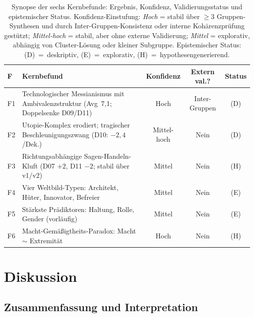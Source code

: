 \documentclass[12pt,a4paper]{article}
\begin{document}

\begin{table}[htbp]
  \centering
  \caption{Synopse der sechs Kernbefunde: Ergebnis, Konfidenz, Validierungsstatus und epistemischer Status. Konfidenz-Einstufung: \emph{Hoch} = stabil \"uber $\geq 3$ Gruppen-Synthesen und durch Inter-Gruppen-Konsistenz oder interne Koh\"arenzpr\"ufung gest\"utzt; \emph{Mittel-hoch} = stabil, aber ohne externe Validierung; \emph{Mittel} = explorativ, abh\"angig von Cluster-L\"osung oder kleiner Subgruppe. Epistemischer Status: (D)~=~deskriptiv, (E)~=~explorativ, (H)~=~hypothesengenerierend.}
  \label{tab:synopse}
  \footnotesize
  \begin{tabularx}{\textwidth}{l X c c c}
    \toprule
    \textbf{F} & \textbf{Kernbefund} & \textbf{Konfidenz} & \textbf{Extern val.?} & \textbf{Status} \\
    \midrule
    F1 & Technologischer Messianismus mit Ambivalenzstruktur (Avg~7,1; Doppelsenke D09/D11) & Hoch & Inter-Gruppen & (D) \\
    F2 & Utopie-Komplex erodiert; tragischer Beschleunigungszwang (D10: $-2{,}4$/Dek.) & Mittel-hoch & Nein & (D) \\
    F3 & Richtungsabh\"angige Sagen-Handeln-Kluft (D07 $+2$, D11 $-2$; stabil \"uber v1/v2) & Mittel & Nein & (H) \\
    F4 & Vier Weltbild-Typen: Architekt, H\"uter, Innovator, Befreier & Mittel & Nein & (E) \\
    F5 & St\"arkste Pr\"adiktoren: Haltung, Rolle, Gender (vorl\"aufig) & Mittel & Nein & (E) \\
    F6 & Macht-Gem\"a\ss{}igtheits-Paradox: Macht $\sim$ Extremit\"at & Hoch & Nein & (H) \\
    \bottomrule
  \end{tabularx}
\end{table}


\section{Diskussion}
\label{sec:diskussion}

\subsection{Zusammenfassung und Interpretation}
\label{sec:diskussion:zusammenfassung}
\end{document}
